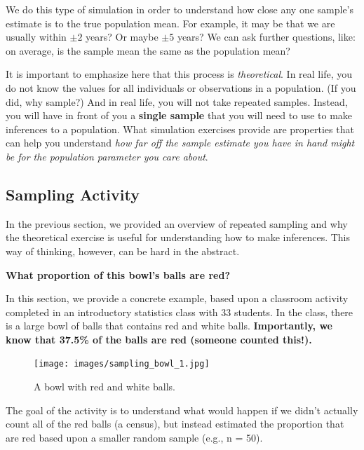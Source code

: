 \documentclass[
  letterpaper,
  DIV=11,
  numbers=noendperiod]{scrreprt}
\theoremstyle{definition}
\theoremstyle{remark}
\begin{document}
We do this type of simulation in order to understand how close any one
sample's estimate is to the true population mean. For example, it may be
that we are usually within \(\pm 2\) years? Or maybe \(\pm 5\) years? We
can ask further questions, like: on average, is the sample mean the same
as the population mean?

It is important to emphasize here that this process is
\emph{theoretical}. In real life, you do not know the values for all
individuals or observations in a population. (If you did, why sample?)
And in real life, you will not take repeated samples. Instead, you will
have in front of you a \textbf{single sample} that you will need to use
to make inferences to a population. What simulation exercises provide
are properties that can help you understand \emph{how far off the sample
estimate you have in hand might be for the population parameter you care
about}.

\hypertarget{sec-sampling-activity}{%
\subsection{Sampling Activity}\label{sec-sampling-activity}}

In the previous section, we provided an overview of repeated sampling
and why the theoretical exercise is useful for understanding how to make
inferences. This way of thinking, however, can be hard in the abstract.

\textbf{What proportion of this bowl's balls are red?}

In this section, we provide a concrete example, based upon a classroom
activity completed in an introductory statistics class with 33 students.
In the class, there is a large bowl of balls that contains red and white
balls. \textbf{Importantly, we know that 37.5\% of the balls are red
(someone counted this!).}

\begin{figure}

{\centering \texttt{[image: images/sampling\_bowl\_1.jpg]}

}

\caption{\label{fig-sampling-exercise-1}A bowl with red and white
balls.}

\end{figure}

The goal of the activity is to understand what would happen if we didn't
actually count all of the red balls (a census), but instead estimated
the proportion that are red based upon a smaller random sample (e.g., n
= 50).
\end{document}
